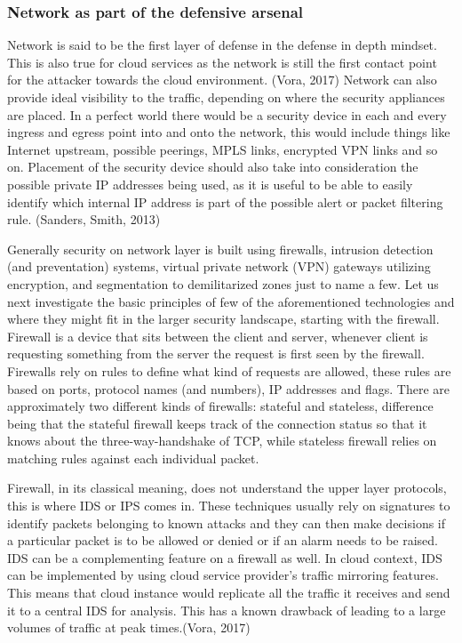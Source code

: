 \documentclass{article}
\begin{document}
\subsubsection{Network as part of the defensive arsenal}
Network is said to be the first layer of defense in the defense in depth mindset. This is also true for cloud services as the network is still the first contact point for the attacker towards the cloud environment. (Vora, 2017)
Network can also provide ideal visibility to the traffic, depending on where the security appliances are placed. In a perfect world there would be a security device in each and every ingress and egress point into and onto the network, this would include things like Internet upstream, possible peerings, MPLS links, encrypted VPN links and so on. Placement of the security device should also take into consideration the possible private IP addresses being used, as it is useful to be able to easily identify which internal IP address is part of the possible alert or packet filtering rule. (Sanders, Smith, 2013)
\par
Generally security on network layer is built using firewalls, intrusion detection (and preventation) systems, virtual private network (VPN) gateways utilizing encryption, and segmentation to demilitarized zones just to name a few. Let us next investigate the basic principles of few of the aforementioned technologies and where they might fit in the larger security landscape, starting with the firewall. Firewall is a device that sits between the client and server, whenever client is requesting something from the server the request is first seen by the firewall. Firewalls rely on rules to define what kind of requests are allowed, these rules are based on ports, protocol names (and numbers), IP addresses and flags. There are approximately two different kinds of firewalls: stateful and stateless, difference being that the stateful firewall keeps track of the connection status so that it knows about the three-way-handshake of TCP, while stateless firewall relies on matching rules against each individual packet.
\par
Firewall, in its classical meaning, does not understand the upper layer protocols, this is where IDS or IPS comes in. These techniques usually rely on signatures to identify packets belonging to known attacks and they can then make decisions if a particular packet is to be allowed or denied or if an alarm needs to be raised. IDS can be a complementing feature on a firewall as well. In cloud context, IDS can be implemented by using cloud service provider's traffic mirroring features. This means that cloud instance would replicate all the traffic it receives and send it to a central IDS for analysis. This has a known drawback of leading to a large volumes of traffic at peak times.(Vora, 2017)
\end{document}

